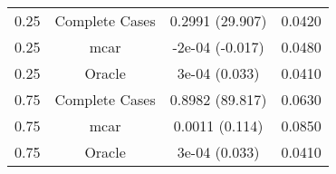 \begin{table}[ht]
\centering
\begin{tabular}{cccc}
  \hline
  \hline
0.25 & Complete Cases & 0.2991 (29.907) & 0.0420 \\ 
  0.25 & mcar & -2e-04 (-0.017) & 0.0480 \\ 
  0.25 & Oracle & 3e-04 (0.033) & 0.0410 \\ 
  0.75 & Complete Cases & 0.8982 (89.817) & 0.0630 \\ 
  0.75 & mcar & 0.0011 (0.114) & 0.0850 \\ 
  0.75 & Oracle & 3e-04 (0.033) & 0.0410 \\ 
   \hline
\end{tabular}
\end{table}

